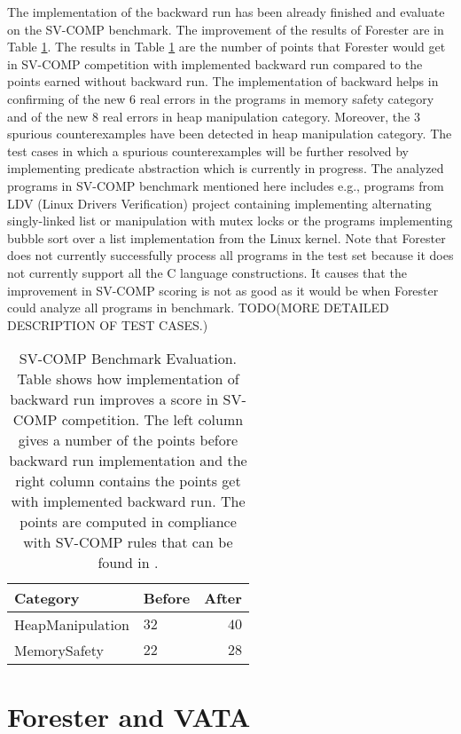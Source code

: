 \documentclass[fleqn,11pt]{ExcelAtFIT} %
\begin{document}
The implementation of the backward run has been already finished and evaluate on the SV-COMP benchmark.
The improvement of the results of Forester are in Table \ref{tab:bwres}.
The results in Table \ref{tab:bwres} are the number of points that Forester would get
in SV-COMP competition with implemented backward run compared to the points earned without backward run.
The implementation of backward helps in confirming of the new $6$ real errors in the programs in memory safety category and
of the new $8$ real errors in heap manipulation category.
Moreover, the $3$ spurious counterexamples have been detected in heap manipulation category.
The test cases in which a spurious counterexamples will be further resolved by implementing predicate
abstraction which is currently in progress.
The analyzed programs in SV-COMP benchmark mentioned here includes e.g., programs from LDV (Linux Drivers Verification) project
containing implementing alternating singly-linked list or manipulation with mutex locks or the programs
implementing bubble sort over a list implementation from the Linux kernel.
Note that Forester does not currently successfully process all programs in the test set
because it does not currently support all the C language constructions.
It causes that the improvement in SV-COMP scoring is not as good as it would be when
Forester could analyze all programs in benchmark.
TODO(MORE DETAILED DESCRIPTION OF TEST CASES.)

\begin{table}[h]
	\vskip6pt
	\caption{SV-COMP Benchmark Evaluation. Table shows how implementation of backward run improves
	a score in SV-COMP competition. The left column gives a number of the points before backward run implementation 
	and the right column contains the points get with implemented backward run.
	The points are computed in compliance with SV-COMP rules that can be found in \cite{www:svcomp}.}
	\centering
	\begin{tabular}{llr}
		\toprule
		Category & Before & After \\
		\midrule
		HeapManipulation & $32$ & $40$ \\
		MemorySafety & $22$ & $28$ \\
		\bottomrule
	\end{tabular}
	\label{tab:bwres}
\end{table}


\section{Forester and VATA}
\label{sec:forvata}
\end{document}
